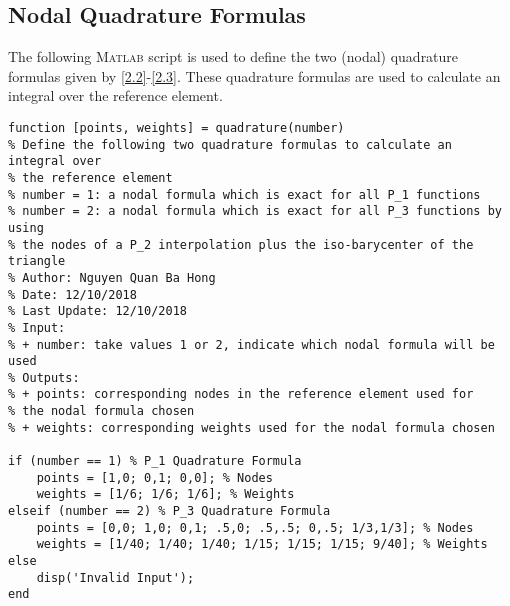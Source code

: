 \documentclass[11pt,a4paper,center,notitlepage]{article}
\numberwithin{equation}{section}
\begin{document}
\subsection{Nodal Quadrature Formulas}\label{sec8.1}
The following \textsc{Matlab} script is used to define the two (nodal) quadrature formulas given by \eqref{2.2}-\eqref{2.3}. These quadrature formulas are used to calculate an integral over the reference element.
\begin{verbatim}
function [points, weights] = quadrature(number)
% Define the following two quadrature formulas to calculate an integral over
% the reference element
% number = 1: a nodal formula which is exact for all P_1 functions
% number = 2: a nodal formula which is exact for all P_3 functions by using
% the nodes of a P_2 interpolation plus the iso-barycenter of the triangle
% Author: Nguyen Quan Ba Hong
% Date: 12/10/2018
% Last Update: 12/10/2018
% Input:
% + number: take values 1 or 2, indicate which nodal formula will be used
% Outputs:
% + points: corresponding nodes in the reference element used for
% the nodal formula chosen
% + weights: corresponding weights used for the nodal formula chosen

if (number == 1) % P_1 Quadrature Formula
    points = [1,0; 0,1; 0,0]; % Nodes
    weights = [1/6; 1/6; 1/6]; % Weights
elseif (number == 2) % P_3 Quadrature Formula
    points = [0,0; 1,0; 0,1; .5,0; .5,.5; 0,.5; 1/3,1/3]; % Nodes
    weights = [1/40; 1/40; 1/40; 1/15; 1/15; 1/15; 9/40]; % Weights
else
    disp('Invalid Input');
end
\end{verbatim}
\end{document}
